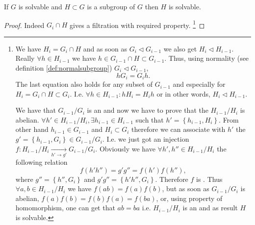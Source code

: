 \begin{property}
  If $G$ is solvable and $H \subset G$ is a subgroup of $G$ then $H$
  is solvable.
  \begin{proof}
    Indeed $G_i \cap H$ gives a filtration with required property.
    \footnote{
      We have $H_i = G_i \cap H$ and as soon as
      $G_i \triangleleft G_{i-1}$ we also get
      $H_i \triangleleft H_{i-1}$. Really $\forall h \in H_{i-1}$ we
      have $h \in G_{i-1} \cap H \subset G_{i-1}$. Thus, using normality
      (see definition \ref{def:normalsubgroup})
      $G_i \triangleleft G_{i-1}$,
      \[
      h G_{i} = G_{i} h.
      \]
      The last equation also holds for any subset of $G_{i-1}$ and
      especially for $H_{i} = G_{i} \cap H \subset G_{i}$. I.e.
      $\forall h \in H_{i-1}: h H_i = H_i h$ or in other words,
      $H_i \triangleleft H_{i-1}$.

      We have that $G_{i-1}/G_i$ is an
       and now we have to prove that the
      $H_{i-1}/H_i$ is abelian. $\forall h' \in H_{i-1}/H_i, \exists
      h_{i-1} \in H_{i-1}$ such that $h' = \left\{h_{i-1},
      H_i\right\}$. From other hand $h_{i-1} \in G_{i-1}$ and
      $H_i \subset G_i$ therefore we can associate with $h'$ the
      $g' =  \left\{h_{i-1}, G_i\right\} \in G_{i-1}/G_i$. I.e. we just
      got an injection $f: H_{i-1}/H_i \xrightarrow[h' \to g']{}
      G_{i-1}/G_i$. Obviously we have $\forall h',h'' \in H_{i-1}/H_i$
      the following relation
      \[
      f\left(h' h''\right) = g' g'' =
      f\left(h'\right) f\left(h''\right),
      \]
      where $g'' = \left\{h'', G_i\right\}$ and
      $g' g'' = \left\{h' h'', G_i\right\}$. Therefore $f$ is
      . Thus $\forall a,b \in H_{i-1}/H_i$
      we have $f(ab) = f(a) f(b)$, but as soon as $G_{i-1}/G_i$ is
      abelian, $f(a) f(b) = f(b) f(a) = f(ba)$, or, using property of
      homomorphism, one can get that $ab=ba$ i.e. $H_{i-1}/H_i$ is an
       and as result $H$ is solvable.
    }
  \end{proof}
  \label{property:lec8_solvable1}
\end{property}

